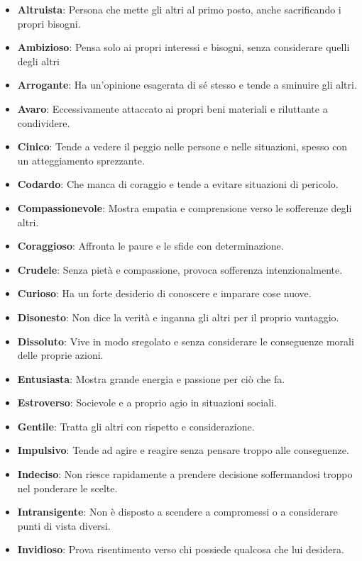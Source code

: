 \documentclass[a4paper,twoside,openany]{book}
\begin{document}
\begin{multicols}{2}
	\noindent\begin{itemize}[leftmargin=*] \setlength{\itemsep}{0pt}
		\item \textbf{Altruista}: Persona che mette gli altri al primo posto, anche sacrificando i propri bisogni.
		\item \textbf{Ambizioso}: Pensa solo ai propri interessi e bisogni, senza considerare quelli degli altri
		\item \textbf{Arrogante}: Ha un'opinione esagerata di sé stesso e tende a sminuire gli altri.
		\item \textbf{Avaro}: Eccessivamente attaccato ai propri beni materiali e riluttante a condividere.
		\item \textbf{Cinico}: Tende a vedere il peggio nelle persone e nelle situazioni, spesso con un atteggiamento sprezzante.
		\item \textbf{Codardo}: Che manca di coraggio e tende a evitare situazioni di pericolo.
		\item \textbf{Compassionevole}: Mostra empatia e comprensione verso le sofferenze degli altri.
		\item \textbf{Coraggioso}: Affronta le paure e le sfide con determinazione.
		\item \textbf{Crudele}: Senza pietà e compassione, provoca sofferenza intenzionalmente.
		\item \textbf{Curioso}: Ha un forte desiderio di conoscere e imparare cose nuove.
		\item \textbf{Disonesto}: Non dice la verità e inganna gli altri per il proprio vantaggio.
		\item \textbf{Dissoluto}: Vive in modo sregolato e senza considerare le conseguenze morali delle proprie azioni.
		\item \textbf{Entusiasta}: Mostra grande energia e passione per ciò che fa.
		\item \textbf{Estroverso}: Socievole e a proprio agio in situazioni sociali.
		\item \textbf{Gentile}: Tratta gli altri con rispetto e considerazione.
		\item \textbf{Impulsivo}: Tende ad agire e reagire senza pensare troppo alle conseguenze.
		\item \textbf{Indeciso}: Non riesce rapidamente a prendere decisione soffermandosi troppo nel ponderare le scelte.
		\item \textbf{Intransigente}: Non è disposto a scendere a compromessi o a considerare punti di vista diversi.
		\item \textbf{Invidioso}: Prova risentimento verso chi possiede qualcosa che lui desidera.

\end{itemize}
\end{multicols}
\end{document}
